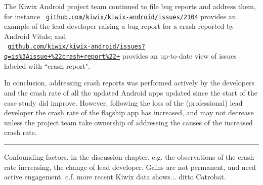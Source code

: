 The Kiwix Android project team continued to file bug reports and address them, for instance {\small~\href{https://github.com/kiwix/kiwix-android/issues/2104}{\texttt{github.com/kiwix/kiwix-android/issues/2104}}} 
provides an example of the lead developer raising a bug report for a crash reported by Android Vitals; and \\{\small ~\href{https://github.com/kiwix/kiwix-android/issues?q=is\%3Aissue+\%22crash+report\%22+}{\texttt{github.com/kiwix/kiwix-android/issues?q=is\%3Aissue+\%22crash+report\%22+}}} provides an up-to-date view of issues labeled with ``crash report". 

In conclusion, addressing crash reports was performed actively by the developers and the crash rate of all the updated Android apps updated since the start of the case study did improve. However, following the loss of the (professional) lead developer the crash rate of the flagship app has increased, and may not decrease unless the project team take ownership of addressing the causes of the increased crash rate.

\par\noindent\rule{\textwidth}{0.4pt}

Confounding factors, in the discussion chapter. e.g. the observations of the crash rate increasing, the change of lead developer. Gains are not permanent, and need active engagement. c.f. more recent Kiwix data shows... ditto Catrobat.

